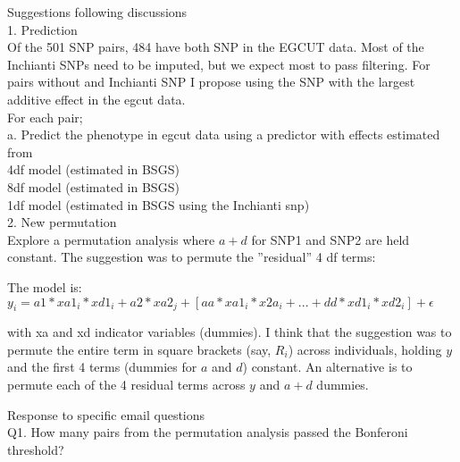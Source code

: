 \documentclass[paper=a4, fontsize=11pt]{scrartcl}         %
\numberwithin{equation}{section}                  %
\numberwithin{figure}{section}                    %
\numberwithin{table}{section}                   %
\begin{document}
\newpage

Suggestions following discussions \\

1. Prediction \\
Of the 501 SNP pairs, 484 have both SNP in the EGCUT data. Most of the Inchianti SNPs need to be imputed, but we expect most to pass filtering. For pairs without and Inchianti SNP I propose using the SNP with the largest additive effect in the egcut data. \\

For each pair; \\

a. Predict the phenotype in egcut data using a predictor with effects estimated from \\

4df model (estimated in BSGS) \\
8df model (estimated in BSGS) \\
1df model (estimated in BSGS using the Inchianti snp) \\


2. New permutation \\

Explore a permutation analysis where $a+d$ for SNP1 and SNP2 are held constant. The suggestion was to permute the ''residual'' 4 df terms:

The model is: \\

$y_i=a1*xa1_i*xd1_i+a2*xa2_j+\left [ aa*xa1_i*x2a_i+...+dd*xd1_i*xd2_i \right ]+\epsilon $


with xa and xd indicator variables (dummies). I think that the suggestion was to permute the entire term in square brackets (say, $R_i$) across individuals, holding $y$ and the first 4 terms (dummies for $a$ and $d$) constant. An alternative is to permute each of the 4 residual terms across $y$ and $a+d$ dummies.


\newpage

Response to specific email questions \\

Q1. How many pairs from the permutation analysis passed the Bonferoni threshold?
\end{document}
